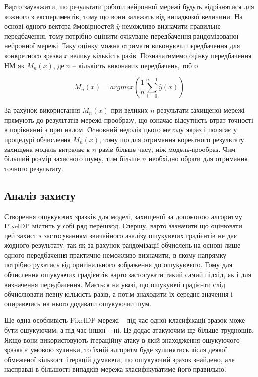 \documentclass[14pt,a4paper]{extarticle}
\newcounter{e}
\numberwithin{equation}{section}
\numberwithin{figure}{section}
\begin{document}
 Варто зауважити, що результати роботи нейронної мережі будуть відрізнятися для кожного з експериментів, тому що вони залежать від випадкової величини. На основі одного вектора ймовірностей $\hat{y}$ неможливо визначити правильне передбачення, тому потрібно оцінити очікуване передбачення рандомізованої нейронної мережі. Таку оцінку можна отримати 
 виконуючи передбачення для конкретного зразка $x$ велику кількість разів. Позначатимемо оцінку передбачення НМ як $M_n(x)$, де $n$ -- кількість виконаних передбачень, тобто
 
 \begin{equation}
 	M_n(x) = argmax\left(\frac{1}{n}\sum\limits_{i = 0}^{n-1}\hat{y}(x)\right)
 \end{equation}
 
 За рахунок використання $M_n(x)$ при великих $n$ результати захищеної мережі прямують до результатів мережі прообразу, що означає відсутність втрат точності в порівнянні з оригіналом. Оcновний недолік цього методу якраз і полягає у процедурі обчислення $M_n(x)$, тому що для отримання коректного результату захищена модель витрачає в $n$ разів більше часу, ніж модель-прообраз. Чим більший розмір захисного шуму, тим більше $n$ необхідно обрати для отримання точного результату.
 
 \subsection{Аналіз захисту}
 Створення ошукуючих зразків для моделі, захищеної за допомогою алгоритму PixelDP містить у собі ряд перешкод. Спершу, варто зазначити що оцінювати цей захист з застосуванням звичайного аналізу ошукуючих градієнтів не дає жодного результату, так як за рахунок рандомізації обчислень на основі лише одного передбачення практично неможливо визначити, в якому напрямку потрібно рухатись від оригінального зображення до ошукуючого. Тому для обчислення ошукуючих градієнтів варто застосувати такий самий підхід, як і для визначення передбачення. Мається на увазі, що ошукуючі градієнти слід обчислювати певну кількість разів, а потім знаходити їх середнє значення і опираючись на нього додавати ошукуючий шум.
 
 Ще одна особливість PixelDP-мережі -- під час одної класифікації зразок може бути ошукуючим, а під час іншої -- ні. Це додає атакуючим ще більше труднощів. Якщо вони використовують ітераційну атаку в якій знаходження ошукуючого зразка є умовою зупинки, то їхній алгоритм буде зупинятись після деякої обмеженої кількості ітерацій думаючи, що ошукуючий зразок знайдено, але насправді в більшості випадків мережа класифікуватиме його правильно. 
 
\end{document}
